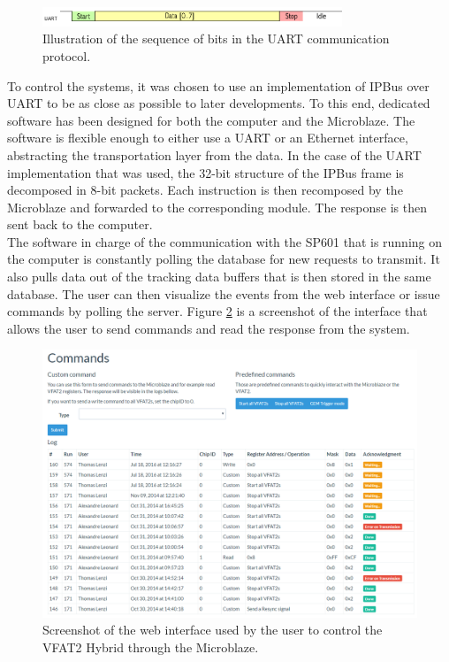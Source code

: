       \begin{figure}[b!]
        \centering
        \includegraphics[width=0.8\textwidth]{img/III-1-arch/uart.png}
        \caption{Illustration of the sequence of bits in the UART communication protocol.}
        \label{fig:III-1-uart}
      \end{figure}

      To control the systems, it was chosen to use an implementation of IPBus over UART to be as close as possible to later developments. To this end, dedicated software has been designed for both the computer and the Microblaze. The software is flexible enough to either use a UART or an Ethernet interface, abstracting the transportation layer from the data. In the case of the UART implementation that was used, the 32-bit structure of the IPBus frame is decomposed in 8-bit packets. Each instruction is then recomposed by the Microblaze and forwarded to the corresponding module. The response is then sent back to the computer. \\

      The software in charge of the communication with the SP601 that is running on the computer is constantly polling the database for new requests to transmit. It also pulls data out of the tracking data buffers that is then stored in the same database. The user can then visualize the events from the web interface or issue commands by polling the server. Figure \ref{fig:III-1-app-cmd} is a screenshot of the interface that allows the user to send commands and read the response from the system.

      \begin{figure}[t!]
        \centering
        \includegraphics[width=\textwidth]{img/III-1-arch/app-cmd.png}
        \caption{Screenshot of the web interface used by the user to control the VFAT2 Hybrid through the Microblaze.}
        \label{fig:III-1-app-cmd}
      \end{figure}

